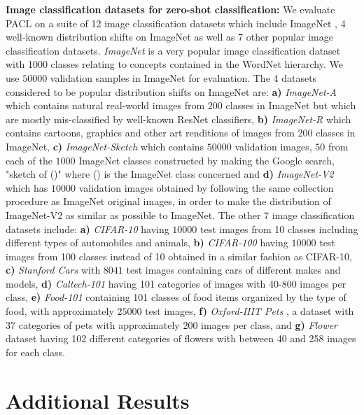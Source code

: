 \documentclass[10pt,twocolumn,letterpaper]{article}
\begin{document}
\textbf{Image classification datasets for zero-shot classification: } We evaluate PACL on a suite of 12 image classification datasets which include ImageNet \cite{deng2009imagenet}, 4 well-known distribution shifts on ImageNet as well as 7 other popular image classification datasets. \emph{ImageNet} is a very popular image classification dataset with 1000 classes relating to concepts contained in the WordNet hierarchy. We use $50000$ validation samples in ImageNet for evaluation. The 4 datasets considered to be popular distribution shifts on ImageNet are: \textbf{a)} \emph{ImageNet-A} \cite{hendrycks2021natural} which contains natural real-world images from 200 classes in ImageNet but which are mostly mis-classified by well-known ResNet classifiers, \textbf{b)} \emph{ImageNet-R} \cite{hendrycks2021many} which contains cartoons, graphics and other art renditions of images from 200 classes in ImageNet, \textbf{c)} \emph{ImageNet-Sketch} \cite{wang2019learning} which contains $50000$ validation images, $50$ from each of the $1000$ ImageNet classes constructed by making the Google search, "sketch of ()" where () is the ImageNet class concerned and \textbf{d)} \emph{ImageNet-V2} \cite{recht2019imagenet} which has $10000$ validation images obtained by following the same collection procedure as ImageNet original images, in order to make the distribution of ImageNet-V2 as similar as possible to ImageNet. The other 7 image classification datasets include: \textbf{a)} \emph{CIFAR-10} \cite{krizhevsky2009learning} having $10000$ test images from 10 classes including different types of automobiles and animals, \textbf{b)} \emph{CIFAR-100} \cite{krizhevsky2009learning} having $10000$ test images from 100 classes instead of 10 obtained in a similar fashion as CIFAR-10, \textbf{c)} \emph{Stanford Cars} \cite{KrauseStarkDengFei-Fei_3DRR2013} with $8041$ test images containing cars of different makes and models, \textbf{d)} \emph{Caltech-101} \cite{caltech101} having 101 categories of images with 40-800 images per class, \textbf{e)} \emph{Food-101} \cite{bossard14} containing 101 classes of food items organized by the type of food, with approximately $25000$ test images, \textbf{f)} \emph{Oxford-IIIT Pets} \cite{parkhi12a}, a dataset with $37$ categories of pets with approximately $200$ images per class, and \textbf{g)} \emph{Flower} dataset \cite{Nilsback08} having 102 different categories of flowers with between 40 and 258 images for each class.


\section{Additional Results}
\label{app:additional_results}
\end{document}
